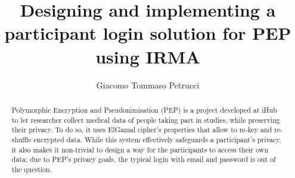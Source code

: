 \documentclass{report}
\begin{document}
\title{Designing and implementing a participant login solution for PEP using IRMA}
\author{Giacomo Tommaso Petrucci}
\maketitle

\begin{abstract}
	Polymorphic Encryption and Pseudonimisation (PEP) is a project developed at iHub to let researcher collect medical data of people taking part in studies, while preserving their 
	privacy. To do so, it uses ElGamal cipher's properties that allow to re-key and re-shuffle encrypted data. While this system effectively safeguards a participant's privacy, it 
	also makes it non-trivial to design a way for the participants to access their own data: due to PEP's privacy goals, the typical login with email and password is out of the
	question. 
\end{abstract}

\tableofcontents
\pagebreak
\end{document}
